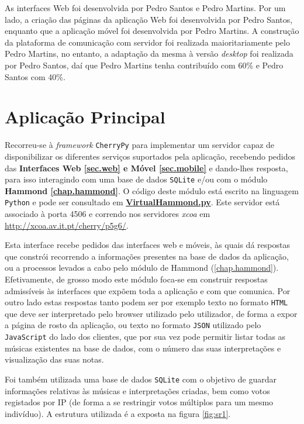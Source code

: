 \documentclass[a4paper,11pt,openright,oneside]{report}
\begin{document}
As interfaces Web foi desenvolvida por Pedro Santos e Pedro Martins. Por um lado, a criação das páginas da aplicação Web foi desenvolvida por Pedro Santos, enquanto que a aplicação móvel foi desenvolvida por Pedro Martins. A construção da plataforma de comunicação com servidor foi realizada maioritariamente pelo Pedro Martins, no entanto, a adaptação da mesma à versão \textit{desktop} foi realizada por Pedro Santos, daí que Pedro Martins tenha contribuído com 60\% e Pedro Santos com 40\%.


\chapter{Aplicação Principal}
\label{chap.mainapp}

Recorreu-se à \textit{framework} \verb|CherryPy| para implementar um servidor capaz de disponibilizar os diferentes serviços suportados pela aplicação, recebendo pedidos das \textbf{Interfaces Web \autoref{sec.web} e Móvel \ref{sec.mobile}} e dando-lhes resposta, para isso interagindo com uma base de dados \verb|SQLite| e/ou com o módulo \textbf{Hammond \ref{chap.hammond}}. O código deste módulo está escrito na linguagem \verb|Python| e pode ser consultado em \href{../../MainApp/VirtualHammond.py}{\textbf{VirtualHammond.py}}. Este servidor está associado à porta 4506 e correndo nos servidores \textit{xcoa} em \url{http://xcoa.av.it.pt/cherry/p5g6/}.

Esta interface recebe pedidos das interfaces web e móveis, às quais dá respostas que constrói recorrendo a informações presentes na base de dados da aplicação, ou a processos levados a cabo pelo módulo de Hammond (\ref{chap.hammond}). Efetivamente, de grosso modo este módulo foca-se em construir respostas admissíveis às interfaces que expõem toda a aplicação e com que comunica. Por outro lado estas respostas tanto podem ser por exemplo texto no formato \verb|HTML| que deve ser interpretado pelo browser utilizado pelo utilizador, de forma a expor a página de rosto da aplicação, ou texto no formato \verb|JSON| utilizado pelo \verb|JavaScript| do lado dos clientes, que por sua vez pode permitir listar todas as músicas existentes na base de dados, com o número das suas interpretações e visualização das suas notas.

Foi também utilizada uma base de dados \verb|SQLite| com o objetivo de guardar informações relativas às músicas e interpretações criadas, bem como votos registados por IP (de forma a se restringir votos múltiplos para um mesmo indivíduo). A estrutura utilizada é a exposta na figura \ref{fig:sr1}.
\end{document}
